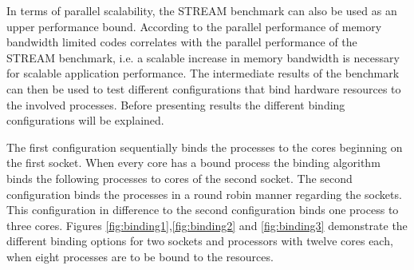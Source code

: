 In terms of parallel scalability, the STREAM benchmark can also be used as an upper performance bound. According to \cite{petsc-web-page} the parallel performance of memory bandwidth limited codes correlates with the parallel performance of the STREAM benchmark, i.e. a scalable increase in memory bandwidth is necessary for scalable application performance. The intermediate results of the benchmark can then be used to test different configurations that bind hardware resources to the involved processes. Before presenting results the different binding configurations will be explained.

The first configuration sequentially binds the processes to the cores beginning on the first socket. When every core has a bound process the binding algorithm binds the following processes to cores of the second socket. The second configuration binds the processes in a round robin manner regarding the sockets. This configuration in difference to the second configuration binds one process to three cores. Figures \ref{fig:binding1},\ref{fig:binding2} and \ref{fig:binding3} demonstrate the different binding options for two sockets and processors with twelve cores each, when eight processes are to be bound to the resources.

%    
%
%    
%
%
%    

